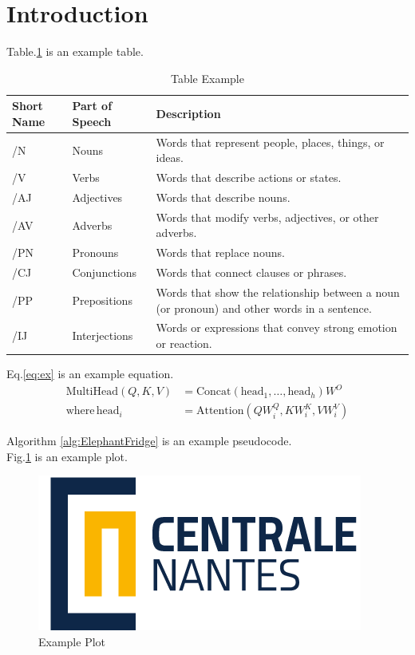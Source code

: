  \chapter*{Introduction}

Table.\ref{tab:ex} is an example table.
\begin{table}[h]
\centering
\begin{tabular}{|p{2cm}|p{3cm}|p{5cm}|}
\hline
Short Name & Part of Speech & Description \\
\hline
/N         & Nouns          & Words that represent people, places, things, or ideas. \\
/V         & Verbs          & Words that describe actions or states. \\
/AJ        & Adjectives     & Words that describe nouns. \\
/AV        & Adverbs        & Words that modify verbs, adjectives, or other adverbs. \\
/PN        & Pronouns       & Words that replace nouns. \\
/CJ        & Conjunctions   & Words that connect clauses or phrases. \\
/PP        & Prepositions   & Words that show the relationship between a noun (or pronoun) and other words in a sentence. \\
/IJ        & Interjections  & Words or expressions that convey strong emotion or reaction. \\
\hline
\end{tabular}
\caption{Table Example}
\label{tab:ex}
\end{table}

\noindent
Eq.\ref{eq:ex} is an example equation.
\begin{equation}
\label{eq:ex}
\begin{aligned}
\text{MultiHead}(Q, K, V) & = \text{Concat}(\text{head}_1, \ldots, \text{head}_h) W^O \\
\text{where} \, \text{head}_i & = \text{Attention}(Q W^Q_i, K W^K_i, V W^V_i)
\end{aligned}
\end{equation}

\noindent
Algorithm \ref{alg:ElephantFridge} is an example pseudocode.\\

\noindent
Fig.\ref{fig:ex} is an example plot.
\begin{figure}[H]\centering
  \includegraphics[width=0.5\linewidth]{Figures/LogoECN.png}
  \caption{Example Plot} 
  \label{fig:ex}
\end{figure}



